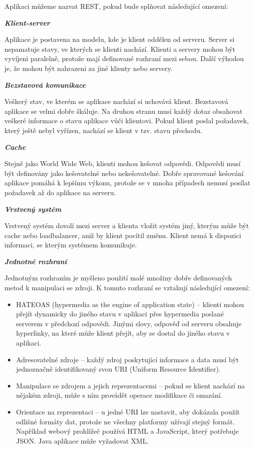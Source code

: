 \documentclass[11pt,twoside,a4paper]{book}
\begin{document}
Aplikaci můžeme nazvat REST, pokud bude splňovat následující omezení:

\textbf{\textit{Klient-server}}

Aplikace je postavena na modelu, kde je klient oddělen od serveru. Server si nepamatuje
stavy, ve kterých se klienti nachází. Klienti a servery mohou být vyvíjeni paralelně, protože
mají definované rozhraní mezi sebou. Další výhodou je, že mohou být nahrazeni za jiné
klienty nebo servery.

\textbf{\textit{Bezstavová komunikace}}

Veškerý stav, ve kterém se aplikace nachází si uchovává klient. Bezstavová aplikace se velmi
dobře škáluje. Na druhou stranu musí každý dotaz obsahovat veškeré informace o stavu
aplikace vůči klientovi. Pokud klient poslal požadavek, který ještě nebyl vyřízen, nachází se
klient v tzv. stavu přechodu.

\textbf{\textit{Cache}}

Stejně jako World Wide Web, klienti mohou kešovat odpovědi. Odpovědi musí být
definovány jako kešovatelné nebo nekešovatelné. Dobře spravované kešování aplikace
pomáhá k lepšímu výkonu, protože se v mnoha případech nemusí posílat požadavek až do
aplikace na serveru.

\textbf{\textit{Vrstvený systém}}

Vrstvený systém dovolí mezi server a klienta vložit systém jiný, kterým může být cache nebo
loadbalancer, aniž by klient pocítil změnu. Klient nemá k dispozici informaci, se kterým
systémem komunikuje.

\textbf{\textit{Jednotné rozhraní}}

Jednotným rozhraním je myšleno použití malé množiny dobře definovaných metod k
manipulaci se zdroji. K tomuto rozhraní se vztahují následující omezení:

\begin{itemize}
  \item HATEOAS (hypermedia as the engine of application state) – klienti mohou přejít
dynamicky do jiného stavu v aplikaci přes hypermedia poslané serverem v předchozí
odpovědi. Jinými slovy, odpověď od serveru obsahuje hyperlinky, na které může klient
přejít, aby se dostal do jiného stavu v aplikaci.
  \item Adresovatelné zdroje – každý zdroj poskytující informace a data musí být
jednoznačně identifikovaný svou URI (Uniform Resource Identifier).
\item Manipulace se zdrojem a jejich reprezentacemi – pokud se klient nachází na
nějakém zdroji, může s ním provádět operace modifikace či smazání.
\item Orientace na reprezentaci – u jedné URI lze nastavit, aby dokázala použít odlišné
formáty dat, protože ne všechny platformy užívají stejný formát. Například webový
prohlížeč používá HTML a JavaScript, který potřebuje JSON. Java aplikace může
vyžadovat XML.
\end{itemize}
\end{document}
